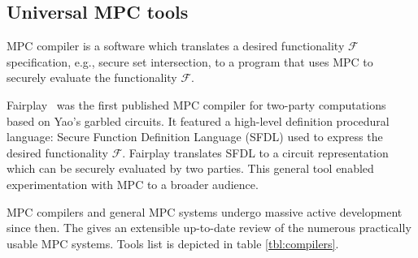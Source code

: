 \documentclass[
  digital, %
  twoside, %
  table,   %
  lof,     %
  lot,     %
]{fithesis3}
\theoremstyle{definition}
\theoremstyle{remark}
\begin{document}
\subsection{Universal MPC tools}
MPC compiler is a software which translates a desired functionality $\mathcal{F}$ specification, e.g., secure set intersection, to a program that uses MPC to securely evaluate the functionality $\mathcal{F}$.

Fairplay~\cite{MNPS04} was the first published MPC compiler for two-party computations based on Yao's garbled circuits. It featured a high-level definition procedural language: Secure Function Definition Language (SFDL) used to express the desired functionality $\mathcal{F}$. Fairplay translates SFDL to a circuit representation which can be securely evaluated by two parties. This general tool enabled experimentation with MPC to a broader audience. 

MPC compilers and general MPC systems undergo massive active development since then. The \cite{sok19} gives an extensible up-to-date review of the numerous practically usable MPC systems. Tools list is depicted in table \ref{tbl:compilers}. %
\end{document}
